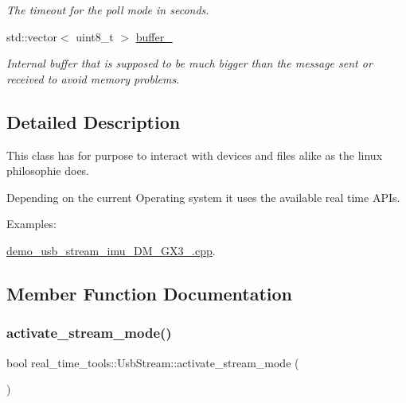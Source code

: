 \begin{DoxyCompactItemize}
\begin{DoxyCompactList}\small\item\em The timeout for the poll mode in seconds. \end{DoxyCompactList}\item 
\mbox{\label{classreal__time__tools_1_1UsbStream_ae5a19cde3cc21a0c878be3fe4cb54f2d}} 
std\+::vector$<$ uint8\+\_\+t $>$ \hyperlink{classreal__time__tools_1_1UsbStream_ae5a19cde3cc21a0c878be3fe4cb54f2d}{buffer\+\_\+}
\begin{DoxyCompactList}\small\item\em Internal buffer that is supposed to be much bigger than the message sent or received to avoid memory problems. \end{DoxyCompactList}\end{DoxyCompactItemize}


\subsection{Detailed Description}
This class has for purpose to interact with devices and files alike as the linux philosophie does. 

Depending on the current Operating system it uses the available real time A\+P\+Is. \begin{Desc}
\item[Examples\+: ]\par
\hyperlink{demo_usb_stream_imu_3DM_GX3_25_8cpp-example}{demo\+\_\+usb\+\_\+stream\+\_\+imu\+\_\+D\+M\+\_\+\+G\+X3\+\_.\+cpp}.\end{Desc}


\subsection{Member Function Documentation}
\mbox{\label{classreal__time__tools_1_1UsbStream_a6e13bacd3b24a8e60b27cbcefefdb3f4}} 
\subsubsection{\texorpdfstring{activate\+\_\+stream\+\_\+mode()}{activate\_stream\_mode()}}
{\footnotesize\ttfamily bool real\+\_\+time\+\_\+tools\+::\+Usb\+Stream\+::activate\+\_\+stream\+\_\+mode (\begin{DoxyParamCaption}{ }\end{DoxyParamCaption})}



